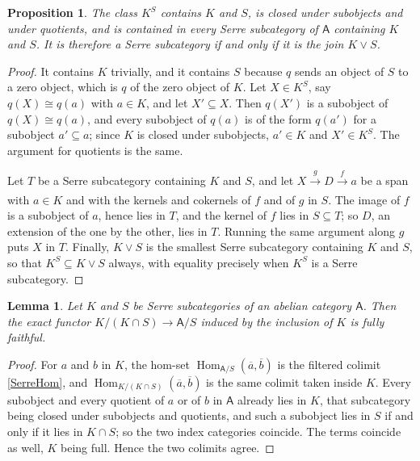 \documentclass[reqno,a4paper]{amsart}
\numberwithin{equation}{section}
\theoremstyle{plain}
\newtheorem{proposition}[subsection]{Proposition}
\newtheorem{lemma}[subsection]{Lemma}
\theoremstyle{definition}
\newcommand{\iso}{\cong}
\newcommand{\ov}[1]{\overline{#1}}
\newcommand{\onecat}[1]{\ensuremath{\mathsf{#1}}\xspace}
\renewcommand{\1}{\onecat{1}}
\DeclareMathOperator{\Hom}{Hom}
\newcommand{\aar}[2][]{\xrightarrow[#1]{#2}}
\begin{document}
\begin{proposition}\label{P:Saturation}
	The class \(K^{S}\) contains \(K\) and \(S\), is closed under subobjects and under quotients, and is contained in every Serre subcategory of \(\onecat{A}\) containing \(K\) and \(S\). It is therefore a Serre subcategory if and only if it is the join \(K\vee S\).
\end{proposition}

\begin{proof}
	It contains \(K\) trivially, and it contains \(S\) because \(q\) sends an object of \(S\) to a zero object, which is \(q\) of the zero object of \(K\). Let \(X\in K^{S}\), say \(q(X)\iso q(a)\) with \(a\in K\), and let \(X'\subseteq X\). Then \(q(X')\) is a subobject of \(q(X)\iso q(a)\), and every subobject of \(q(a)\) is of the form \(q(a')\) for a subobject \(a'\subseteq a\); since \(K\) is closed under subobjects, \(a'\in K\) and \(X'\in K^{S}\). The argument for quotients is the same.

	Let \(T\) be a Serre subcategory containing \(K\) and \(S\), and let \(X\aar{g}D\aar{f}a\) be a span with \(a\in K\) and with the kernels and cokernels of \(f\) and of \(g\) in \(S\). The image of \(f\) is a subobject of \(a\), hence lies in \(T\), and the kernel of \(f\) lies in \(S\subseteq T\); so \(D\), an extension of the one by the other, lies in \(T\). Running the same argument along \(g\) puts \(X\) in \(T\). Finally, \(K\vee S\) is the smallest Serre subcategory containing \(K\) and \(S\), so that \(K^{S}\subseteq K\vee S\) always, with equality precisely when \(K^{S}\) is a Serre subcategory.
\end{proof}

\begin{lemma}\label{L:FullyFaithful}
	Let \(K\) and \(S\) be Serre subcategories of an abelian category \(\onecat{A}\). Then the exact functor \(K/(K\cap S)\to\onecat{A}/S\) induced by the inclusion of \(K\) is fully faithful.
\end{lemma}

\begin{proof}
	For \(a\) and \(b\) in \(K\), the hom-set \(\Hom_{\onecat{A}/S}(\ov{a},\ov{b})\) is the filtered colimit \eqref{SerreHom}, and \(\Hom_{K/(K\cap S)}(\ov{a},\ov{b})\) is the same colimit taken inside \(K\). Every subobject and every quotient of \(a\) or of \(b\) in \(\onecat{A}\) already lies in \(K\), that subcategory being closed under subobjects and quotients, and such a subobject lies in \(S\) if and only if it lies in \(K\cap S\); so the two index categories coincide. The terms coincide as well, \(K\) being full. Hence the two colimits agree.
\end{proof}
\end{document}
